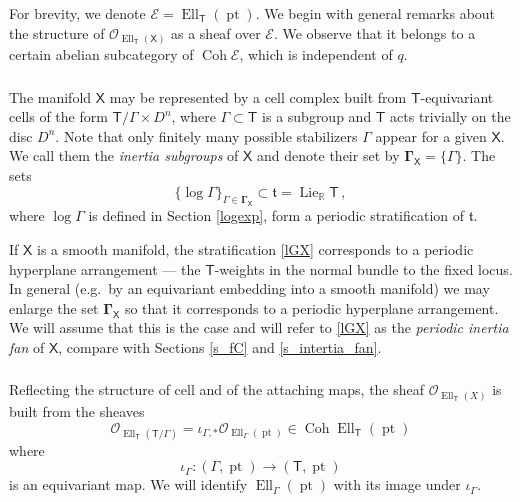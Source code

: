 \documentclass[14pt]{extarticle}
\newcommand{\task}[1]{\bigskip\noindent
  \boxed{\texttt{#1}}\bigskip}
\newcommand{\R}{\mathbb{R}}
\newcommand{\bT}{\mathsf{T}}
\newcommand{\bX}{\mathsf{X}}
\newcommand{\cE}{\mathscr{E}}
\newcommand{\bGamma}{\boldsymbol{\Gamma}}
\newcommand{\ft}{\mathfrak{t}}
\newcommand{\cO}{\mathscr{O}}
\DeclareMathOperator{\Coh}{Coh}
\DeclareMathOperator{\Lie}{Lie}
\DeclareMathOperator{\Ell}{Ell}
\DeclareMathOperator{\pt}{pt}
\theoremstyle{definition}
\begin{document}

For brevity, we denote $\cE=\Ell_\bT(\pt)$. 
We begin with general remarks about the structure of
$\cO_{\Ell_\bT(\bX)}$ as a sheaf over $\cE$. We observe
that it belongs to a certain abelian subcategory of
$\Coh \cE$, which is independent of $q$.

\subsubsection{}



The manifold $\bX$ may be represented by a cell complex  built from $\bT$-equivariant cells of the form
$\bT/\Gamma  \times D^n$, where $\Gamma \subset \bT$ is a
subgroup and $\bT$ acts trivially on the disc $D^n$. Note that only 
finitely many possible
stabilizers $\Gamma$ appear for a given $\bX$. We call them the
\emph{inertia subgroups} of $\bX$  and denote their set by
$\bGamma_\bX=\{\Gamma\}$. The sets
%
\begin{equation}
\{\log \Gamma \}_{\Gamma \in \bGamma_\bX} \subset \ft = \Lie_\R
\bT\label{lGX} \,, 
\end{equation}
%
where $\log \Gamma$ is defined in Section \ref{logexp}, form a
periodic stratification of $\ft$. 


If $\bX$ is a smooth manifold, the stratification \eqref{lGX}
corresponds to a periodic hyperplane arrangement --- the $\bT$-weights
in the normal bundle to the fixed locus. In general (e.g.\ by an equivariant
embedding into a smooth manifold) we may enlarge the set $\bGamma_\bX$
so that it corresponds to a periodic hyperplane arrangement. We will
assume that this is the case and will refer to \eqref{lGX} as the  
\emph{periodic inertia fan} of $\bX$, compare with Sections \ref{s_fC}
and 
\ref{s_intertia_fan}.


\subsubsection{} 

Reflecting the structure of cell and of the attaching maps, the sheaf $\cO_{\Ell_\bT(X)}$ is
built from the  sheaves
$$
\cO_{\Ell_\bT(\bT/\Gamma)} = \iota_{\Gamma,*} \cO_{\Ell_\Gamma(\pt)}
\in \Coh \Ell_\bT(\pt)
$$
where
$$
\iota_\Gamma: (\Gamma, \pt) \to (\bT, \pt) 
$$
is an equivariant map. We will identify $\Ell_\Gamma(\pt)$ with its 
image under $\iota_\Gamma$.

\subsubsection{}
\end{document}

